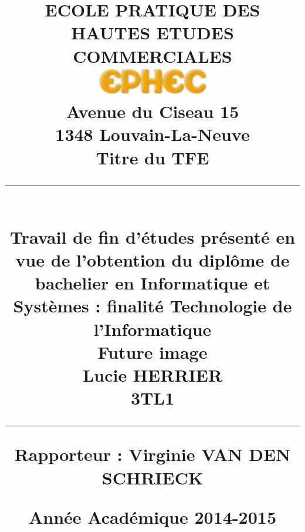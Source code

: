 \title{
\parbox{15cm}
{	
	\begin{center}
	\large ECOLE PRATIQUE DES HAUTES ETUDES COMMERCIALES\\
	\vspace{.5cm}
	\includegraphics[width=5cm]{ephec.png}\\
	Avenue du Ciseau 15\\
	1348 Louvain-La-Neuve\\
	\vspace{2cm}
	\sf\bfseries\Huge
	Titre du TFE
	\rule{15cm}{1pt}\\
	\normalsize\mdseries Travail de fin d'études présenté en vue de l'obtention du diplôme de bachelier en Informatique et Systèmes : finalité Technologie de l'Informatique\\
	\vspace{1cm}
	Future image\\
	\vspace{.5cm}
	\bfseries\LARGE
		Lucie HERRIER\\ \Large 3TL1
	\rule{15cm}{1pt}
	\end{center}
	\vspace{1cm}
	\bf\normalsize Rapporteur : Virginie VAN DEN SCHRIECK
	\vspace{4cm}
	\begin{center}
	\Large Année Académique 2014-2015
	\end{center}
}} 
